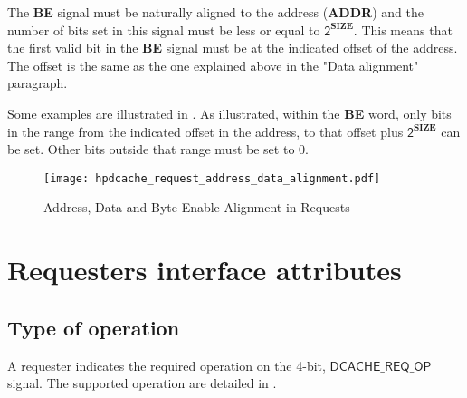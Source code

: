 \documentclass[10pt,titlepage,twoside]{book}
\begin{document}
The \textbf{BE} signal must be naturally aligned to the address (\textbf{ADDR}) and the number of bits set in this signal must be less or equal to $\mathsf{2^\mathbf{SIZE}}$.
This means that the first valid bit in the \textbf{BE} signal must be at the indicated offset of the address.
The offset is the same as the one explained above in the "Data alignment" paragraph.

Some examples are illustrated in .
As illustrated, within the \textbf{BE} word, only bits in the range from the indicated offset in the address, to that offset plus $\mathsf{2^\mathbf{SIZE}}$ can be set.
Other bits outside that range must be set to 0.

\begin{figure}[tbp]
    \centering
    \texttt{[image: hpdcache\_request\_address\_data\_alignment.pdf]}
    \caption{Address, Data and Byte Enable Alignment in Requests}
\end{figure}


\clearpage
\section{Requesters interface attributes}%

\subsection{Type of operation}%

A requester indicates the required operation on the 4-bit, $\mathsf{DCACHE\_REQ\_OP}$ signal.
The supported operation are detailed in .
\end{document}
